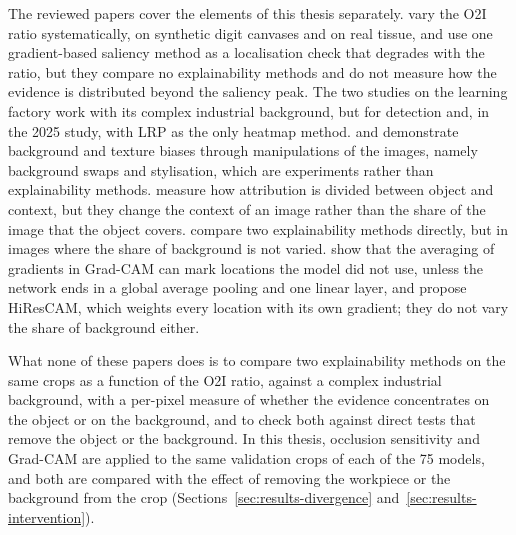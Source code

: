 The reviewed papers cover the elements of this thesis separately. \citet{pawlowski2019needles} vary the O2I ratio systematically, on synthetic digit
canvases and on real tissue, and use one gradient-based saliency method as a
localisation check that degrades with the ratio, but they compare no explainability
methods and do not measure how the evidence is distributed beyond the saliency peak. The two studies on the
learning factory \citep{schneidereitFischertechnik2023, schneidereitYOLOv8} work with
its complex industrial background, but for detection and, in the 2025 study, with LRP
as the only heatmap method. \citet{xiao2021noise} and \citet{geirhos2019texture} demonstrate background and texture biases through
manipulations of the images, namely background swaps and stylisation, which are
experiments rather than explainability methods. \citet{adhikari2024lostincontext} measure how attribution is divided between object
and context, but they change the context of an image rather than the share of the image
that the object covers. \citet{ennab2025interpretability} compare two
explainability methods directly, but in images where the share of background is not
varied. \citet{draelos2021hirescam} show that the averaging of
gradients in Grad-CAM can mark locations the model did not use, unless the network ends
in a global average pooling and one linear layer, and propose HiResCAM, which weights
every location with its own gradient; they do not vary the share of background either.

What none of these papers does is to compare two explainability methods on the same
crops as a function of the O2I ratio, against a complex industrial background, with a
per-pixel measure of whether the evidence concentrates on the object or on the
background, and to check both against direct tests that remove the object or the
background. In this thesis, occlusion sensitivity and Grad-CAM are applied to the same
validation crops of each of the 75 models, and both are compared with the effect of
removing the workpiece or the background from the crop
(Sections~\ref{sec:results-divergence} and~\ref{sec:results-intervention}).
